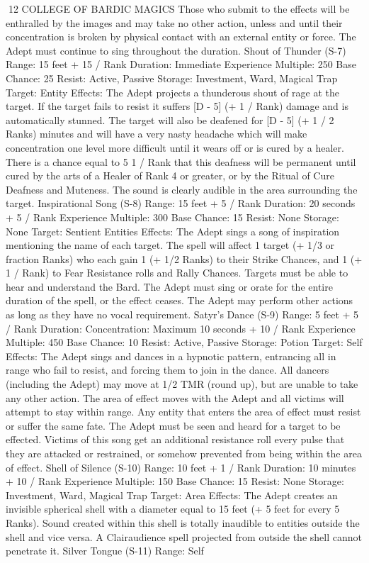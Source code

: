 \documentclass[a4paper]{article}
\begin{document}
\begin{multicols}{3}
12 COLLEGE OF BARDIC MAGICS
Those who submit to the effects will be enthralled
by the images and may take no other action, unless
and until their concentration is broken by physical
contact with an external entity or force. The Adept
must continue to sing throughout the duration.
Shout of Thunder (S-7)
Range: 15 feet + 15 / Rank
Duration: Immediate
Experience Multiple: 250
Base Chance: 25%
Resist: Active, Passive
Storage: Investment, Ward, Magical Trap
Target: Entity
Effects: The Adept projects a thunderous shout of
rage at the target. If the target fails to resist it suffers [D - 5] (+ 1 / Rank) damage and is automatically stunned. The target will also be deafened for
[D - 5] (+ 1 / 2 Ranks) minutes and will have a
very nasty headache which will make concentration one level more difficult until it wears off or is
cured by a healer. There is a chance equal to 5%
1 / Rank that this deafness will be permanent until
cured by the arts of a Healer of Rank 4 or greater,
or by the Ritual of Cure Deafness and Muteness.
The sound is clearly audible in the area surrounding the target.
Inspirational Song (S-8)
Range: 15 feet + 5 / Rank
Duration: 20 seconds + 5 / Rank
Experience Multiple: 300
Base Chance: 15%
Resist: None
Storage: None
Target: Sentient Entities
Effects: The Adept sings a song of inspiration
mentioning the name of each target. The spell will
affect 1 target (+ 1/3 or fraction Ranks) who each
gain 1 (+ 1/2 Ranks) to their Strike Chances, and 1
(+ 1 / Rank) to Fear Resistance rolls and Rally
Chances. Targets must be able to hear and understand the Bard. The Adept must sing or orate for
the entire duration of the spell, or the effect ceases.
The Adept may perform other actions as long as
they have no vocal requirement.
Satyr’s Dance (S-9)
Range: 5 feet + 5 / Rank
Duration: Concentration: Maximum 10 seconds +
10 / Rank
Experience Multiple: 450
Base Chance: 10%
Resist: Active, Passive
Storage: Potion
Target: Self
Effects: The Adept sings and dances in a hypnotic
pattern, entrancing all in range who fail to resist,
and forcing them to join in the dance. All dancers
(including the Adept) may move at 1/2 TMR
(round up), but are unable to take any other action.
The area of effect moves with the Adept and all
victims will attempt to stay within range. Any
entity that enters the area of effect must resist or
suffer the same fate. The Adept must be seen and
heard for a target to be effected. Victims of this
song get an additional resistance roll every pulse
that they are attacked or restrained, or somehow
prevented from being within the area of effect.
Shell of Silence (S-10)
Range: 10 feet + 1 / Rank
Duration: 10 minutes + 10 / Rank
Experience Multiple: 150
Base Chance: 15%
Resist: None
Storage: Investment, Ward, Magical Trap
Target: Area
Effects: The Adept creates an invisible spherical
shell with a diameter equal to 15 feet (+ 5 feet for
every 5 Ranks). Sound created within this shell is
totally inaudible to entities outside the shell and
vice versa. A Clairaudience spell projected from
outside the shell cannot penetrate it.
Silver Tongue (S-11)
Range: Self


\end{multicols}
\end{document}
